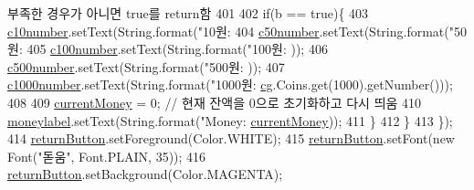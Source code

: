 \begin{DoxyCode}
{{{{{{{{{{{{{{{{{{{{{{{{{{{{{{{{{{{{{{{{{{{{{{{{{       부족한 경우가 아니면 true를 return함}
401                 
402                 \textcolor{keywordflow}{if}(b == \textcolor{keyword}{true})\{
403                     \hyperlink{class_vending_machine_1_1_machine_u_i_a87030fea4819a0534fe536af2084a6e5}{c10number}.setText(String.format(\textcolor{stringliteral}{"10원: %
404                     \hyperlink{class_vending_machine_1_1_machine_u_i_a41f6d6db82cc6d27f2961c71d8fff229}{c50number}.setText(String.format(\textcolor{stringliteral}{"50원: %
405                     \hyperlink{class_vending_machine_1_1_machine_u_i_a3541b20a550888418c19ed32a0d7ac10}{c100number}.setText(String.format(\textcolor{stringliteral}{"100원: %
      ));
406                     \hyperlink{class_vending_machine_1_1_machine_u_i_ab6f47810cb959c1353a04f8aba54ae21}{c500number}.setText(String.format(\textcolor{stringliteral}{"500원: %
      ));
407                     \hyperlink{class_vending_machine_1_1_machine_u_i_a019654970035375965815c2c6bf4fc71}{c1000number}.setText(String.format(\textcolor{stringliteral}{"1000원: %
      \hyperlink{class_vending_machine_1_1_machine_u_i_a3aacb919b7c540d71bb398666f03dc08}{cg}.Coins.get(1000).getNumber()));
408                 
409                     \hyperlink{class_vending_machine_1_1_machine_u_i_ab9b12975e6462529e3abda75e7ebf272}{currentMoney} = 0;  \textcolor{comment}{// 현재 잔액을 0으로 초기화하고 다시 띄움}
410                     \hyperlink{class_vending_machine_1_1_machine_u_i_a9da605a2313ee30b2219bce28977b9fe}{moneylabel}.setText(String.format(\textcolor{stringliteral}{"Money: %
      \hyperlink{class_vending_machine_1_1_machine_u_i_ab9b12975e6462529e3abda75e7ebf272}{currentMoney}));
411                 \}
412             \}
413         \});
414         \hyperlink{class_vending_machine_1_1_machine_u_i_ad82aa0418636517fefcd1ec842d44523}{returnButton}.setForeground(Color.WHITE);
415         \hyperlink{class_vending_machine_1_1_machine_u_i_ad82aa0418636517fefcd1ec842d44523}{returnButton}.setFont(\textcolor{keyword}{new} Font(\textcolor{stringliteral}{"돋움"}, Font.PLAIN, 35));
416         \hyperlink{class_vending_machine_1_1_machine_u_i_ad82aa0418636517fefcd1ec842d44523}{returnButton}.setBackground(Color.MAGENTA);
}}}}}}}}}}}}}}}}}}}}}}}}}}}}}}}}}}}}}}}}}}}}}}}}}}}}}}
\end{DoxyCode}

